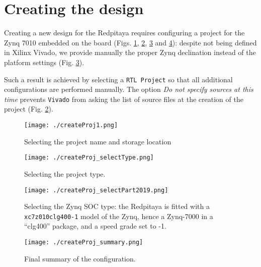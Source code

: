 \documentclass[10pt,oneside]{article}
\begin{document}

\section{Creating the design}

Creating a new design for the Redpitaya requires configuring a project for
the Zynq 7010 embedded on the board (Figs. \ref{createProj1}, \ref{createProj_selectType}, 
\ref{createProj_selectpart} and \ref{createProj_summary}): despite not being 
defined in Xilinx Vivado, we provide manually the proper Zynq declination
instead of the platform settings (Fig. \ref{createProj_selectpart}).

Such a result is achieved by selecting a {\tt RTL Project} so that all additional
configurations are performed manually. The option {\em Do not specify sources at this time} 
prevents {\tt Vivado} from asking the list of source files at the creation of the project
(Fig. \ref{createProj_selectType}).

\begin{figure}[h!tb]
\begin{center}
\texttt{[image: ./createProj1.png]}
\end{center}
\caption{Selecting the project name and storage location}
\label{createProj1}
\end{figure}

\begin{figure}[h!tb]
\begin{center}
\texttt{[image: ./createProj\_selectType.png]}
\end{center}
\caption{Selecting the project type.}
\label{createProj_selectType}
\end{figure}
\begin{figure}[h!tb]
\begin{center}
\texttt{[image: ./createProj\_selectPart2019.png]}
\end{center}
\caption{Selecting the Zynq SOC type: the Redpitaya is fitted with a {\tt xc7z010clg400-1} model
of the Zynq, hence a Zynq-7000 in a ``clg400'' package, and a speed grade set to -1.}
\label{createProj_selectpart}
\end{figure}
\begin{figure}[h!tb]
\begin{center}
\texttt{[image: ./createProj\_summary.png]}
\end{center}
\caption{Final summary of the configuration.}
\label{createProj_summary}
\end{figure}
\end{document}
